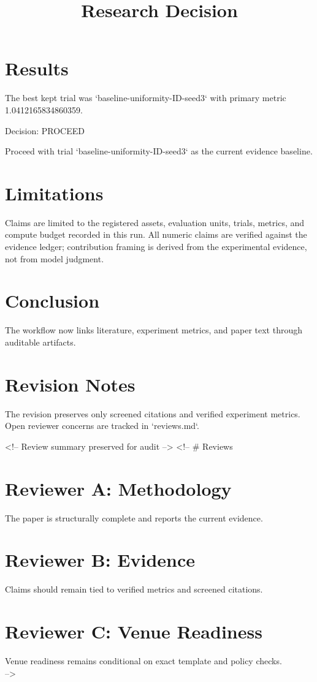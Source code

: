 \documentclass{article}
\begin{document}
\section{Results}
The best kept trial was `baseline-uniformity-ID-seed3` with primary metric 1.0412165834860359.
\title{Research Decision}
\maketitle

Decision: PROCEED

Proceed with trial `baseline-uniformity-ID-seed3` as the current evidence baseline.

\section{Limitations}
Claims are limited to the registered assets, evaluation units, trials, metrics, and compute budget recorded in this run. All numeric claims are verified against the evidence ledger; contribution framing is derived from the experimental evidence, not from model judgment.

\section{Conclusion}
The workflow now links literature, experiment metrics, and paper text through auditable artifacts.

\section{Revision Notes}
The revision preserves only screened citations and verified experiment metrics. Open reviewer concerns are tracked in `reviews.md`.

<!-- Review summary preserved for audit -->
<!-- \# Reviews

\section{Reviewer A: Methodology}
\noindent The paper is structurally complete and reports the current evidence.\\
\section{Reviewer B: Evidence}
\noindent Claims should remain tied to verified metrics and screened citations.\\
\section{Reviewer C: Venue Readiness}
\noindent Venue readiness remains conditional on exact template and policy checks.\\
 -->
\end{document}
